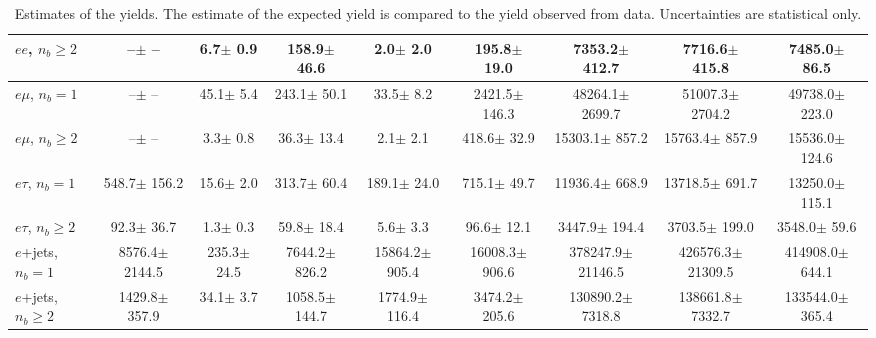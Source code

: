 \begin{sidewaystable}[p]
\begin{tabular}{l|cccccc|cc}
    $e e$, $n_b\geq2$                  &       --$\pm$     -- &      6.7$\pm$    0.9 &    158.9$\pm$   46.6 &      2.0$\pm$    2.0 &    195.8$\pm$   19.0 &   7353.2$\pm$  412.7 &   7716.6$\pm$  415.8 &   7485.0$\pm$   86.5 \\ 
    \hline
    $e\mu$, $n_b=1$                    &       --$\pm$     -- &     45.1$\pm$    5.4 &    243.1$\pm$   50.1 &     33.5$\pm$    8.2 &   2421.5$\pm$  146.3 &  48264.1$\pm$ 2699.7 &  51007.3$\pm$ 2704.2 &  49738.0$\pm$  223.0 \\ 
    $e\mu$, $n_b\geq2$                 &       --$\pm$     -- &      3.3$\pm$    0.8 &     36.3$\pm$   13.4 &      2.1$\pm$    2.1 &    418.6$\pm$   32.9 &  15303.1$\pm$  857.2 &  15763.4$\pm$  857.9 &  15536.0$\pm$  124.6 \\ 
    \hline
    $e\tau$, $n_b=1$                   &    548.7$\pm$  156.2 &     15.6$\pm$    2.0 &    313.7$\pm$   60.4 &    189.1$\pm$   24.0 &    715.1$\pm$   49.7 &  11936.4$\pm$  668.9 &  13718.5$\pm$  691.7 &  13250.0$\pm$  115.1 \\ 
    $e\tau$, $n_b\geq2$                &     92.3$\pm$   36.7 &      1.3$\pm$    0.3 &     59.8$\pm$   18.4 &      5.6$\pm$    3.3 &     96.6$\pm$   12.1 &   3447.9$\pm$  194.4 &   3703.5$\pm$  199.0 &   3548.0$\pm$   59.6 \\ 
    \hline
    $e$+jets, $n_b=1$                  &   8576.4$\pm$ 2144.5 &    235.3$\pm$   24.5 &   7644.2$\pm$  826.2 &  15864.2$\pm$  905.4 &  16008.3$\pm$  906.6 & 378247.9$\pm$21146.5 & 426576.3$\pm$21309.5 & 414908.0$\pm$  644.1 \\ 
    $e$+jets, $n_b\geq2$               &   1429.8$\pm$  357.9 &     34.1$\pm$    3.7 &   1058.5$\pm$  144.7 &   1774.9$\pm$  116.4 &   3474.2$\pm$  205.6 & 130890.2$\pm$ 7318.8 & 138661.8$\pm$ 7332.7 & 133544.0$\pm$  365.4 \\ 
    \hline

    \end{tabular}
    \caption{Estimates of the yields. The estimate of the expected yield is compared to
    the yield observed from data.  Uncertainties are statistical only.
    \label{tab:yields}}
\end{sidewaystable}
